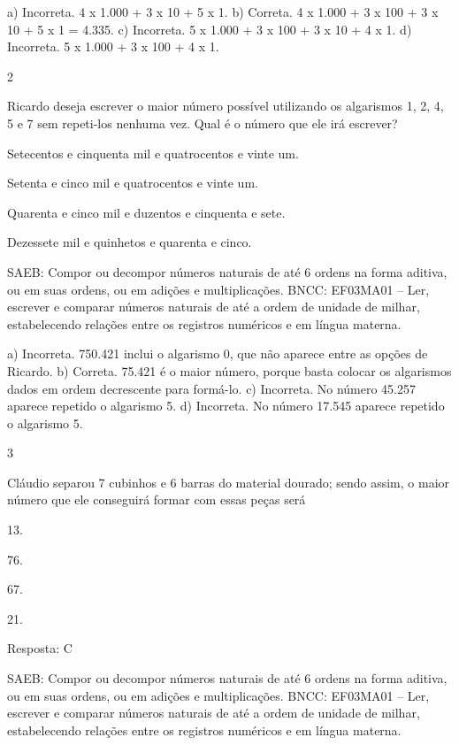 \begin{multicols}{2}
{\begin{escolha}
{a) Incorreta. 4 x 1.000 + 3 x 10 + 5 x 1.
b) Correta. 4 x 1.000 + 3 x 100 + 3 x 10 + 5 x 1 = 4.335.
c) Incorreta. 5 x 1.000 + 3 x 100 + 3 x 10 + 4 x 1.
d) Incorreta. 5 x 1.000 + 3 x 100 + 4 x 1.

\num{2}

Ricardo deseja escrever o maior número possível utilizando os algarismos 1, 2, 4, 5 e 7 sem repeti-los nenhuma vez. Qual é o número que ele irá escrever?

\begin{escolha}
\item
  Setecentos e cinquenta mil e quatrocentos e vinte um.
\item
  Setenta e cinco mil e quatrocentos e vinte um.
\item
  Quarenta e cinco mil e duzentos e cinquenta e sete.
\item
  Dezessete mil e quinhetos e quarenta e cinco.
\end{escolha}

SAEB: Compor ou decompor números naturais de até 6 ordens na forma aditiva, ou em suas ordens, ou em adições e multiplicações.
BNCC: EF03MA01 -- Ler, escrever e comparar números naturais de até a ordem de unidade de milhar, estabelecendo relações entre os registros numéricos e em língua materna.

a) Incorreta. 750.421 inclui o algarismo 0, que não aparece entre as opções de Ricardo.
b) Correta. 75.421 é o maior número, porque basta colocar os algarismos dados em ordem decrescente para formá-lo.
c) Incorreta. No número 45.257 aparece repetido o algarismo 5. 
d) Incorreta. No número 17.545 aparece repetido o algarismo 5. 

\num{3}

Cláudio separou 7 cubinhos e 6 barras do material dourado; sendo assim, o maior número que ele conseguirá formar com essas peças será

\begin{escolha}
\item
  13.
\item
  76.
\item
  67.
\item
  21.
\end{escolha}

Resposta: C



SAEB: Compor ou decompor números naturais de até 6 ordens na forma aditiva, ou em suas ordens, ou em adições e multiplicações.
BNCC: EF03MA01 -- Ler, escrever e comparar números naturais de até a ordem de unidade de milhar, estabelecendo relações entre os registros numéricos e em língua materna.

}
\end{escolha}}
\end{multicols}
